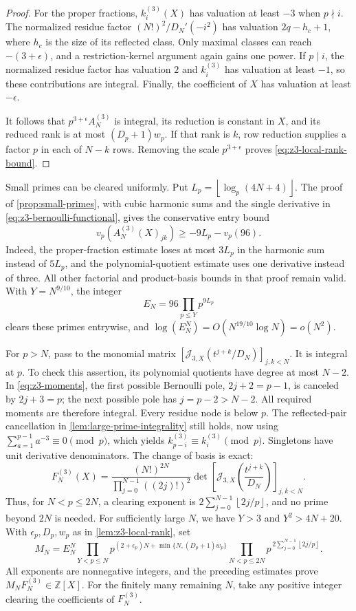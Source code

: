 \documentclass[11pt,letterpaper]{article}
\theoremstyle{definition}
\newcommand{\Z}{\mathbb Z}
\newcommand{\floor}[1]{\left\lfloor #1\right\rfloor}
\begin{document}
\begin{proof}
For the proper fractions, $k_i^{(3)}(X)$ has valuation at least $-3$
when $p\nmid i$. The normalized residue factor
$(N!)^2/D_N'(-i^2)$ has valuation $2q-h_c+1$, where $h_c$ is the
size of its reflected class. Only maximal classes can reach
$-(3+\epsilon)$, and a restriction-kernel argument again gains one
power. If $p\mid i$, the normalized residue factor has valuation $2$
and $k_i^{(3)}$ has valuation at least $-1$, so these contributions
are integral. Finally, the coefficient of $X$ has valuation at least
$-\epsilon$.

It follows that $p^{3+\epsilon}A_N^{(3)}$ is integral, its reduction is
constant in $X$, and its reduced rank is at most $(D_p+1)w_p$.
If that rank is $k$, row reduction supplies a factor $p$ in each of
$N-k$ rows. Removing the scale $p^{3+\epsilon}$ proves
\eqref{eq:z3-local-rank-bound}.
\end{proof}

Small primes can be cleared uniformly. Put
$L_p=\floor{\log_p(4N+4)}$. The proof of
\cref{prop:small-primes}, with cubic harmonic sums and the single
derivative in \eqref{eq:z3-bernoulli-functional}, gives the conservative
entry bound
\[
 v_p(A_N^{(3)}(X)_{jk})\ge-9L_p-v_p(96).
\]
Indeed, the proper-fraction estimate loses at most $3L_p$ in the
harmonic sum instead of $5L_p$, and the polynomial-quotient estimate
uses one derivative instead of three. All other factorial and
product-basis bounds in that proof remain valid. With $Y=N^{9/10}$,
the integer
\[
 E_N=96\prod_{p\le Y}p^{9L_p}
\]
clears these primes entrywise, and
$\log(E_N^N)=O(N^{19/10}\log N)=o(N^2)$.

For $p>N$, pass to the monomial matrix
$[\mathcal J_{3,X}(t^{j+k}/D_N)]_{j,k<N}$. It is integral at $p$.
To check this assertion, its polynomial quotients have degree at most
$N-2$. In \eqref{eq:z3-moments}, the first possible Bernoulli pole,
$2j+2=p-1$, is canceled by $2j+3=p$; the next possible pole has
$j=p-2>N-2$. All required moments are therefore integral.
Every residue node is below $p$. The reflected-pair cancellation in
\cref{lem:large-prime-integrality} still holds, now using
$\sum_{a=1}^{p-1}a^{-3}\equiv0\pmod p$, which yields
$k_{p-i}^{(3)}\equiv k_i^{(3)}\pmod p$. Singletons have unit
derivative denominators. The change of basis is exact:
\[
 F_N^{(3)}(X)=
 \frac{(N!)^{2N}}{\prod_{j=0}^{N-1}((2j)!)^2}
 \det\left[\mathcal J_{3,X}\left(\frac{t^{j+k}}{D_N}\right)\right]_{j,k<N}.
\]
Thus, for $N<p\le2N$, a clearing exponent is
$2\sum_{j=0}^{N-1}\floor{2j/p}$, and no prime beyond $2N$ is needed.
For sufficiently large $N$, we have $Y>3$ and $Y^2>4N+20$.
With $\epsilon_p,D_p,w_p$ as in \cref{lem:z3-local-rank}, set
\[
 M_N=E_N^N
 \prod_{Y<p\le N}
 p^{(2+\epsilon_p)N+\min\{N,(D_p+1)w_p\}}
 \prod_{N<p\le2N}p^{\,2\sum_{j=0}^{N-1}\floor{2j/p}}.
\]
All exponents are nonnegative integers, and the preceding estimates
prove $M_NF_N^{(3)}\in\Z[X]$. For the finitely many remaining $N$,
take any positive integer clearing the coefficients of $F_N^{(3)}$.
\end{document}
